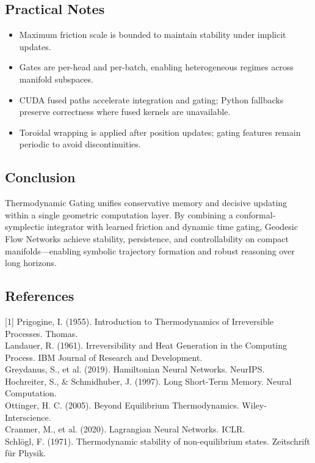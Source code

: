 \documentclass{article}
\numberwithin{equation}{section}
\begin{document}
\subsection{Practical Notes}
\begin{itemize}
\item Maximum friction scale is bounded to maintain stability under implicit updates.
\item Gates are per-head and per-batch, enabling heterogeneous regimes across manifold subspaces.
\item CUDA fused paths accelerate integration and gating; Python fallbacks preserve correctness where fused kernels are unavailable.
\item Toroidal wrapping is applied after position updates; gating features remain periodic to avoid discontinuities.
\end{itemize}

\subsection{Conclusion}
Thermodynamic Gating unifies conservative memory and decisive updating within a single geometric computation layer. By combining a conformal-symplectic integrator with learned friction and dynamic time gating, Geodesic Flow Networks achieve stability, persistence, and controllability on compact manifolds—enabling symbolic trajectory formation and robust reasoning over long horizons.

\subsection*{References}
[1] Prigogine, I. (1955). Introduction to Thermodynamics of Irreversible Processes. Thomas.\\
[2] Landauer, R. (1961). Irreversibility and Heat Generation in the Computing Process. IBM Journal of Research and Development.\\
[3] Greydanus, S., et al. (2019). Hamiltonian Neural Networks. NeurIPS.\\
[4] Hochreiter, S., \& Schmidhuber, J. (1997). Long Short-Term Memory. Neural Computation.\\
[5] Ottinger, H. C. (2005). Beyond Equilibrium Thermodynamics. Wiley-Interscience.\\
[6] Cranmer, M., et al. (2020). Lagrangian Neural Networks. ICLR.\\
[7] Schlögl, F. (1971). Thermodynamic stability of non-equilibrium states. Zeitschrift für Physik.
\end{document}
